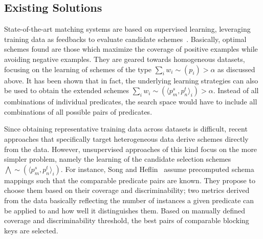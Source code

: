 % 

 

\subsection{Existing Solutions} 
State-of-the-art matching systems are based on supervised learning, leveraging training data as feedbacks to evaluate candidate schemes~\cite{DBLP:conf/vldb/ChaudhuriCGK07}. Basically, optimal schemes found are those which maximize the coverage of positive examples while avoiding negative examples. They are geared towards homogeneous datasets, focusing on the learning of schemes of the type $\sum_i{w_i \sim(p_i)} > \alpha$ as discussed above. It has been shown that in fact, the underlying learning strategies can also be used to obtain the extended schemes $\sum_i{w_i \sim(\langle p^s_m,p^t_n \rangle_i )} > \alpha$. Instead of all combinations of individual predicates, the search space would have to include all combinations of all possible pairs of predicates. 

Since obtaining representative training data across datasets is difficult, recent approaches that specifically target heterogeneous data derive schemes directly from the data. However, unsupervised approaches of this kind focus on the more simpler problem, namely the learning of the candidate selection schemes $\bigwedge \sim(\langle p^s_m,p^t_n \rangle_i)$. For instance, Song and Heflin~\cite{DBLP:conf/semweb/SongH11} assume precomputed schema mappings such that the comparable predicate pairs are known. They propose to choose them based on their coverage and discriminability; two metrics derived from the data basically reflecting the number of instances a given predicate can be applied to and how well it distinguishes them. Based on manually defined coverage and discriminability threshold, the best pairs of comparable blocking keys are selected. 

